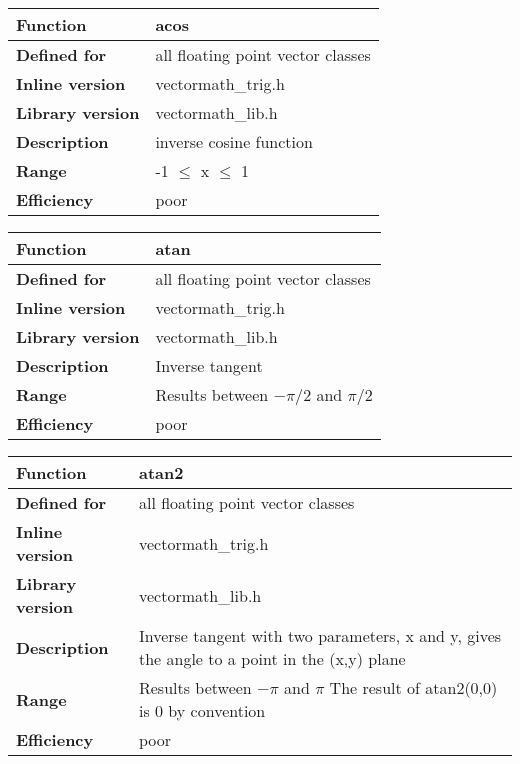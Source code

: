 \documentclass[vcl_manual.tex]{subfiles}
\begin{document}
\begin{tabular}{|p{30mm}|p{120mm}|}
\hline
\bfseries Function & acos \\ \hline
\bfseries Defined for & all floating point vector classes \\ \hline
\bfseries Inline version & vectormath\_trig.h \\ \hline
\bfseries Library version & vectormath\_lib.h \\ \hline
\bfseries Description & inverse cosine function \\ \hline
\bfseries Range & -1 $\leq$ x $\leq$ 1 \\ \hline
\bfseries Efficiency & poor \\ \hline
\end{tabular}


\begin{tabular}{|p{30mm}|p{120mm}|}
\hline
\bfseries Function & atan \\ \hline
\bfseries Defined for & all floating point vector classes \\ \hline
\bfseries Inline version & vectormath\_trig.h \\ \hline
\bfseries Library version & vectormath\_lib.h \\ \hline
\bfseries Description & Inverse tangent \\ \hline
\bfseries Range & Results between $-\pi/2$ and $\pi/2$ \\ \hline
\bfseries Efficiency & poor \\ \hline
\end{tabular}


\begin{tabular}{|p{30mm}|p{120mm}|}
\hline
\bfseries Function & atan2 \\ \hline
\bfseries Defined for & all floating point vector classes \\ \hline
\bfseries Inline version & vectormath\_trig.h \\ \hline
\bfseries Library version & vectormath\_lib.h \\ \hline
\bfseries Description & Inverse tangent with two parameters, x and y, gives the angle to a point in the (x,y) plane \\ \hline
\bfseries Range & Results between $-\pi$ and $\pi$ \newline
The result of atan2(0,0) is 0 by convention\\ \hline
\bfseries Efficiency & poor \\ \hline
\end{tabular}
\end{document}
